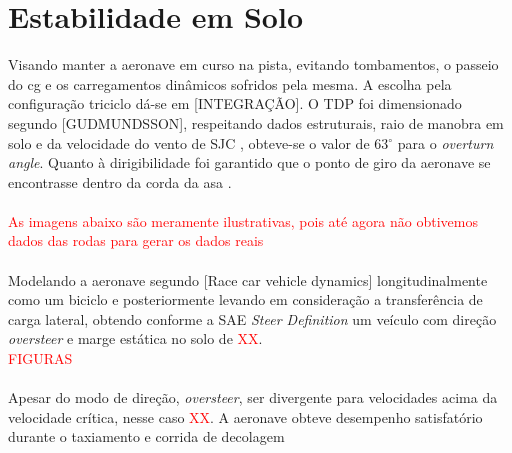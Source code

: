 \section{Estabilidade em Solo}
Visando manter a aeronave em curso na pista, evitando tombamentos, o passeio do cg e os carregamentos dinâmicos sofridos pela mesma. A escolha pela configuração triciclo dá-se em [INTEGRAÇÃO]. O TDP foi dimensionado segundo [GUDMUNDSSON], respeitando dados estruturais, raio de manobra em solo e da velocidade do vento de SJC , obteve-se o valor de 63$^{\circ}$ para o \textit{overturn angle}. Quanto à dirigibilidade foi garantido que o ponto de giro da aeronave se encontrasse dentro da corda da asa .\\
\\
\textcolor{red}{As imagens abaixo são meramente ilustrativas, pois até agora não obtivemos dados das rodas para gerar os dados reais}\\
\\
Modelando a aeronave segundo [Race car vehicle dynamics] longitudinalmente como um biciclo e posteriormente levando em consideração a transferência de carga lateral, obtendo conforme a SAE \textit{Steer Definition}  um veículo com direção \textit{oversteer} e marge estática no solo de \textcolor{red}{XX}.
\\
\textcolor{red}{FIGURAS}\\
\\ 
Apesar do modo de direção, \textit{oversteer}, ser divergente para velocidades acima da velocidade crítica, nesse caso \textcolor{red}{XX}. A aeronave obteve desempenho satisfatório durante o taxiamento e corrida de decolagem